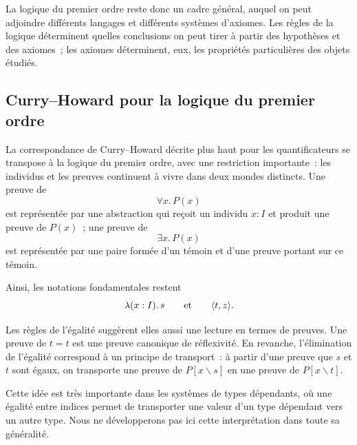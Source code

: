 
\thingy
La logique du premier ordre reste donc un cadre général, auquel on peut
adjoindre différents langages et différents systèmes d'axiomes.  Les
règles de la logique déterminent quelles conclusions on peut tirer à
partir des hypothèses et des axiomes ; les axiomes déterminent, eux, les
propriétés particulières des objets étudiés.

\subsection{Curry--Howard pour la logique du premier ordre}

\thingy
La correspondance de Curry--Howard décrite plus haut pour les
quantificateurs se transpose à la logique du premier ordre, avec une
restriction importante : les individus et les preuves continuent à vivre
dans deux mondes distincts.  Une preuve de
\[
\forall x.\,P(x)
\]
est représentée par une abstraction qui reçoit un individu $x:I$ et
produit une preuve de $P(x)$ ; une preuve de
\[
\exists x.\,P(x)
\]
est représentée par une paire formée d'un témoin et d'une preuve portant
sur ce témoin.

Ainsi, les notations fondamentales restent
\[
\lambda(x:I).\,s
\qquad\hbox{et}\qquad
\langle t,z\rangle.
\]

\thingy
Les règles de l'égalité suggèrent elles aussi une lecture en termes de
preuves.  Une preuve de $t=t$ est une preuve canonique de réflexivité.
En revanche, l'élimination de l'égalité correspond à un principe de
transport : à partir d'une preuve que $s$ et $t$ sont égaux, on transporte
une preuve de $P[x\backslash s]$ en une preuve de $P[x\backslash t]$.

Cette idée est très importante dans les systèmes de types dépendants,
où une égalité entre indices permet de transporter une valeur d'un type
dépendant vers un autre type.  Nous ne développerons pas ici cette
interprétation dans toute sa généralité.



